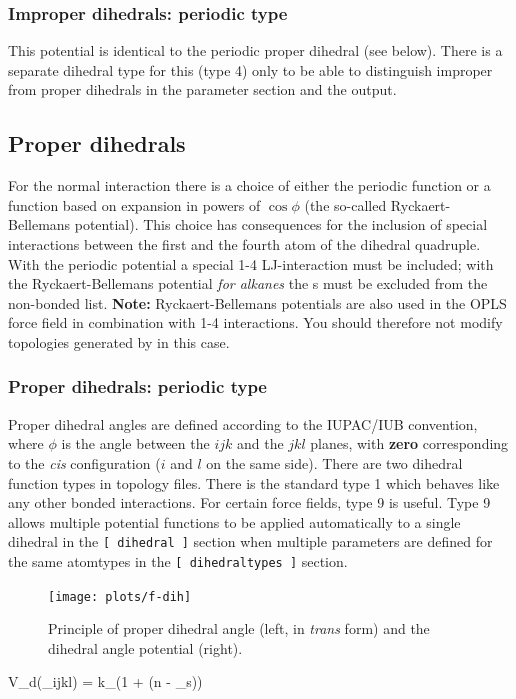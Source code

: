 \subsubsection{Improper dihedrals: periodic type}
\label{subsec:periodicimproperdihedral}
This potential is identical to the periodic proper dihedral (see below).
There is a separate dihedral type for this (type 4) only to be able
to distinguish improper from proper dihedrals in the parameter section
and the output.

\subsection{Proper dihedrals}
For the normal  interaction there is a choice of
either the {\gromos} periodic function or a function based on
expansion in powers of $\cos \phi$ (the so-called Ryckaert-Bellemans
potential). This choice has consequences for the inclusion of special
interactions between the first and the fourth atom of the dihedral
quadruple. With the periodic {\gromos} potential a special 1-4
LJ-interaction must be included; with the Ryckaert-Bellemans potential
{\em for alkanes} the s must be excluded
from the non-bonded list.  {\bf Note:} Ryckaert-Bellemans potentials
are also used in {\eg} the OPLS force field in combination with 1-4
interactions. You should therefore not modify topologies generated by
{\tt {}} in this case.

\subsubsection{Proper dihedrals: periodic type}
\label{subsec:properdihedral}
Proper dihedral angles are defined according to the IUPAC/IUB
convention, where $\phi$ is the angle between the $ijk$ and the $jkl$
planes, with {\bf zero} corresponding to the {\em cis} configuration
($i$ and $l$ on the same side). There are two dihedral function types
in {\gromacs} topology files. There is the standard type 1 which behaves
like any other bonded interactions. For certain force fields, type 9
is useful. Type 9 allows multiple potential functions to be applied
automatically to a single dihedral in the {\tt [ dihedral ]} section
when multiple parameters are defined for the same atomtypes
in the {\tt [ dihedraltypes ]} section.

\begin{figure}
\centerline{\texttt{[image: plots/f-dih]}}
\caption[Proper dihedral angle.]{Principle of proper dihedral angle
(left, in {\em trans} form) and the dihedral angle potential (right).} 
\label{fig:pdihf}
\end{figure}
\beq
V_d(\phi_{ijkl}) = k_{\phi}(1 + \cos(n \phi - \phi_s))
\eeq

